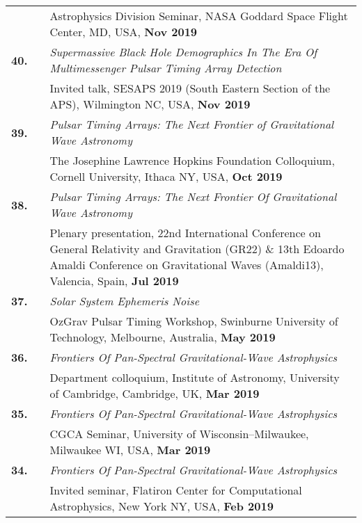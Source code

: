 \documentclass[11pt,letterpaper,sans]{moderncv}
\begin{document}
{\begin{longtable}{rp{0.3cm}p{15.8cm}}
&& Astrophysics Division Seminar, NASA Goddard Space Flight Center, MD, USA, \textbf{Nov 2019} \vspace{0.09cm}\\
\textbf{40.} & & \textit{Supermassive Black Hole Demographics In The Era Of Multimessenger Pulsar Timing Array Detection} \\
&& Invited talk, SESAPS 2019 (South Eastern Section of the APS), Wilmington NC, USA, \textbf{Nov 2019} \vspace{0.09cm}\\
\textbf{39.} & & \textit{Pulsar Timing Arrays: The Next Frontier of Gravitational Wave Astronomy} \\
&& The Josephine Lawrence Hopkins Foundation Colloquium, Cornell University, Ithaca NY, USA, \textbf{Oct 2019} \vspace{0.09cm}\\
\textbf{38.} & & \textit{Pulsar Timing Arrays: The Next Frontier Of Gravitational Wave Astronomy} \\
&& Plenary presentation, 22nd International Conference on General Relativity and Gravitation (GR22) \& 13th Edoardo Amaldi Conference on Gravitational Waves (Amaldi13), Valencia, Spain, \textbf{Jul 2019} \vspace{0.09cm}\\
\textbf{37.} & & \textit{Solar System Ephemeris Noise} \\
&& OzGrav Pulsar Timing Workshop, Swinburne University of Technology, Melbourne, Australia, \textbf{May 2019} \vspace{0.09cm}\\
\textbf{36.} & & \textit{Frontiers Of Pan-Spectral Gravitational-Wave Astrophysics} \\
&& Department colloquium, Institute of Astronomy, University of Cambridge, Cambridge, UK, \textbf{Mar 2019} \vspace{0.09cm}\\
\textbf{35.} & & \textit{Frontiers Of Pan-Spectral Gravitational-Wave Astrophysics} \\
&& CGCA Seminar, University of Wisconsin--Milwaukee, Milwaukee WI, USA, \textbf{Mar 2019} \vspace{0.09cm}\\
\textbf{34.} & & \textit{Frontiers Of Pan-Spectral Gravitational-Wave Astrophysics} \\
&& Invited seminar, Flatiron Center for Computational Astrophysics, New York NY, USA, \textbf{Feb 2019} \vspace{0.09cm}\\

\end{longtable}}
\end{document}
